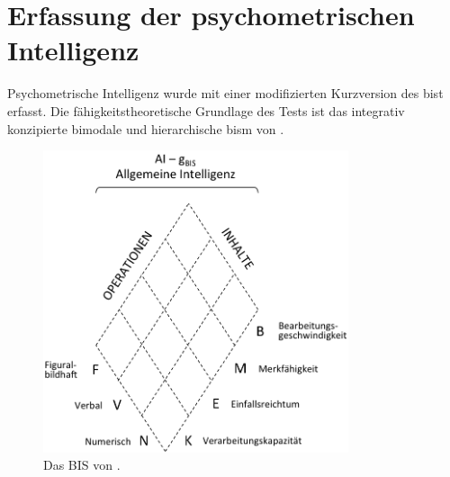\documentclass[11pt, twoside, a4paper]{book}		%
\begin{document}
\section{Erfassung der psychometrischen Intelligenz \label{sec:Erfassung_der_psychometrischen_Intelligenz}}



Psychometrische Intelligenz wurde mit einer modifizierten Kurzversion des \acrlong{bist} \citep[\gls{bist};][]{Jaeger1997} erfasst. Die fähigkeitstheoretische Grundlage des Tests ist das integrativ konzipierte bimodale und hierarchische \gls{bism} von \citet[][siehe \autoref{fig:BIS}]{Jaeger1984}. 

\begin{figure}[htb]
	\centering
	\includegraphics[width=0.8\textwidth]{png/BIS}
	\caption[Das BIS]{Das BIS von \citet{Jaeger1984}.}
	\label{fig:BIS}
\end{figure} 
\end{document}
